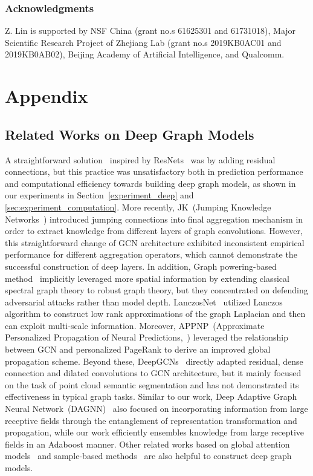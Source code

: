 \documentclass{article} \usepackage{iclr2021_conference,times}
\begin{document}
\subsubsection*{Acknowledgments}
Z. Lin is supported by NSF China (grant no.s 61625301 and 61731018), Major Scientific Research Project of Zhejiang Lab (grant no.s 2019KB0AC01 and 2019KB0AB02), Beijing Academy of Artificial Intelligence, and Qualcomm. 





\clearpage

\small
\appendix

\section{Appendix}
\subsection{Related Works on Deep Graph Models}\label{appendix:deep graph}

A straightforward solution~\citep{kipf2016semi,xu2018representation} inspired by ResNets~\citep{he2016deep} was by adding residual connections, but this practice was unsatisfactory both in prediction performance and computational efficiency towards building deep graph models, as shown in our experiments in Section~\ref{experiment_deep} and \ref{sec:experiment_computation}. More recently, JK~(Jumping Knowledge Networks~\citep{xu2018representation}) introduced jumping connections into final aggregation mechanism in order to extract knowledge from different layers of graph convolutions. However, this straightforward change of GCN architecture exhibited inconsistent empirical performance for different aggregation operators, which cannot demonstrate the successful construction of deep layers. In addition, Graph powering-based method~\citep{jin2019power} implicitly leveraged more spatial information by extending classical spectral graph theory to robust graph theory, but they concentrated on defending adversarial attacks rather than model depth. LanczosNet~\citep{liao2019lanczosnet} utilized Lanczos algorithm to construct low rank approximations of the graph Laplacian and then can exploit multi-scale information. Moreover, APPNP~(Approximate Personalized Propagation of Neural Predictions,~\citep{klicpera2018predict}) leveraged the relationship between GCN and personalized PageRank to derive an improved global propagation scheme. Beyond these, DeepGCNs~\citep{li2019can} directly adapted residual, dense connection and dilated convolutions to GCN architecture, but it mainly focused on the task of point cloud semantic segmentation and has not demonstrated its effectiveness in typical graph tasks. Similar to our work,  Deep Adaptive Graph Neural Network~(DAGNN)~\citep{liu2020towards} also focused on incorporating information from large receptive fields through the entanglement of representation transformation and propagation, while our work efficiently ensembles knowledge from large receptive fields in an Adaboost manner. Other related works based on global attention models~\citep{puny2020graph} and sample-based methods~\citep{zeng2019graphsaint}  are also helpful to construct deep graph models.
\end{document}
